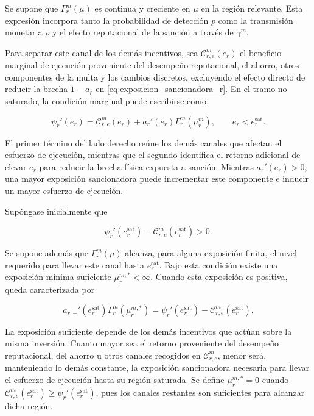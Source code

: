 Se supone que \(\Gamma_r^m(\mu)\) es continua y creciente en \(\mu\) en la región relevante. Esta expresión incorpora tanto la probabilidad de detección \(p\) como la transmisión monetaria \(\rho\) y el efecto reputacional de la sanción a través de \(\gamma^m\).

Para separar este canal de los demás incentivos, sea \(\mathcal C_{r,e}^m(e_r)\) el beneficio marginal de ejecución proveniente del desempeño reputacional, el ahorro, otros componentes de la multa y los cambios discretos, excluyendo el efecto directo de reducir la brecha \(1-a_r\) en \eqref{eq:exposicion_sancionadora_r}. En el tramo no saturado, la condición marginal puede escribirse como

\begin{equation}
\label{eq:foc_probabilidad_cumplimiento}
\psi_r'(e_r)
=
\mathcal C_{r,e}^{m}(e_r)
+
a_r'(e_r)
\Gamma_r^m(\mu_r^m),
\qquad
e_r<e_r^{\mathrm{sat}}.
\end{equation}

El primer término del lado derecho reúne los demás canales que afectan el esfuerzo de ejecución, mientras que el segundo identifica el retorno adicional de elevar \(e_r\) para reducir la brecha física expuesta a sanción. Mientras \(a_r'(e_r)>0\), una mayor exposición sancionadora puede incrementar este componente e inducir un mayor esfuerzo de ejecución.

Supóngase inicialmente que

\begin{equation}
\label{eq:condicion_exposicion_positiva}
\psi_r'(e_r^{\mathrm{sat}})
-
\mathcal C_{r,e}^{m}(e_r^{\mathrm{sat}})
>
0.
\end{equation}

Se supone además que \(\Gamma_r^m(\mu)\) alcanza, para alguna exposición finita, el nivel requerido para llevar este canal hasta \(e_r^{\mathrm{sat}}\). Bajo esta condición existe una exposición mínima suficiente \(\mu_r^{m,*}<\infty\). Cuando esta exposición es positiva, queda caracterizada por

\begin{equation}
\label{eq:multa_suficiente}
a_{r,-}'(e_r^{\mathrm{sat}})
\Gamma_r^m(\mu_r^{m,*})
=
\psi_r'(e_r^{\mathrm{sat}})
-
\mathcal C_{r,e}^{m}(e_r^{\mathrm{sat}}).
\end{equation}

La exposición suficiente depende de los demás incentivos que actúan sobre la misma inversión. Cuanto mayor sea el retorno proveniente del desempeño reputacional, del ahorro u otros canales recogidos en \(\mathcal C_{r,e}^{m}\), menor será, manteniendo lo demás constante, la exposición sancionadora necesaria para llevar el esfuerzo de ejecución hasta su región saturada. Se define \(\mu_r^{m,*}=0\) cuando \(\mathcal C_{r,e}^{m}(e_r^{\mathrm{sat}})\geq\psi_r'(e_r^{\mathrm{sat}})\), pues los canales restantes son suficientes para alcanzar dicha región.

